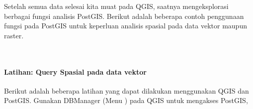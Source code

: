 \documentclass[letterpaper,10pt,english]{sphinxmanual}
\begin{document}
Setelah semua data selesai kita muat pada QGIS, saatnya meng\sphinxhyphen{}eksplorasi berbagai fungsi analisis PostGIS. Berikut adalah beberapa contoh penggunaan fungsi pada PostGIS untuk keperluan analisis spasial pada data vektor maupun raster.

 


\paragraph{Latihan: Query Spasial pada data vektor}
\label{\detokenize{sesi2/postgisquery:latihan-query-spasial-pada-data-vektor}}
Berikut adalah beberapa latihan yang dapat dilakukan menggunakan QGIS dan PostGIS. Gunakan DBManager (Menu ) pada QGIS untuk mengakses PostGIS,
\end{document}
